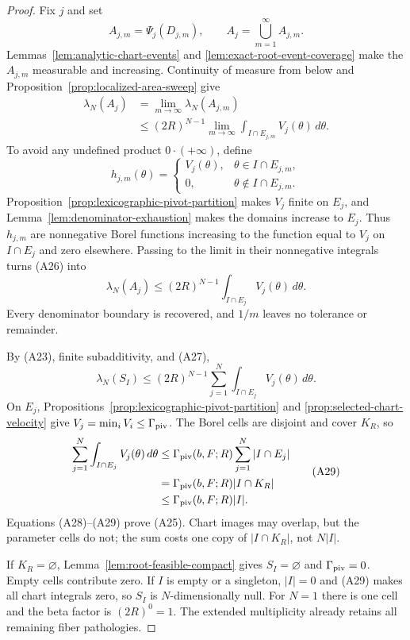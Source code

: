 \begin{proof}
Fix $j$ and set
\[
A_{j,m}=\Psi_j(D_{j,m}),
\qquad A_j=\bigcup_{m=1}^\infty A_{j,m}.
\]
Lemmas~\ref{lem:analytic-chart-events} and
\ref{lem:exact-root-event-coverage} make the $A_{j,m}$ measurable and
increasing.  Continuity of measure from below and
Proposition~\ref{prop:localized-area-sweep} give
\[
\begin{aligned}
\lambda_N(A_j)
&=\lim_{m\to\infty}\lambda_N(A_{j,m})\\
&\leq(2R)^{N-1}\lim_{m\to\infty}
 \int_{I\cap E_{j,m}}V_j(\theta)\,d\theta.
\end{aligned}
\tag{A26}
\]
To avoid any undefined product $0\cdot(+\infty)$, define
\[
h_{j,m}(\theta)=
\begin{cases}
V_j(\theta),&\theta\in I\cap E_{j,m},\\
0,&\theta\notin I\cap E_{j,m}.
\end{cases}
\]
Proposition~\ref{prop:lexicographic-pivot-partition} makes $V_j$ finite on
$E_j$, and Lemma~\ref{lem:denominator-exhaustion} makes the domains increase
to $E_j$.  Thus $h_{j,m}$ are nonnegative Borel functions increasing to the
function equal to $V_j$ on $I\cap E_j$ and zero elsewhere.  Passing to the
limit in their nonnegative integrals turns \textup{(A26)} into
\[
\lambda_N(A_j)
\leq(2R)^{N-1}\int_{I\cap E_j}V_j(\theta)\,d\theta.
\tag{A27}
\]
Every denominator boundary is recovered, and $1/m$ leaves no tolerance or
remainder.

By \textup{(A23)}, finite subadditivity, and \textup{(A27)},
\[
\lambda_N(S_I)
\leq(2R)^{N-1}\sum_{j=1}^N
\int_{I\cap E_j}V_j(\theta)\,d\theta.
\tag{A28}
\]
On $E_j$, Propositions~\ref{prop:lexicographic-pivot-partition} and
\ref{prop:selected-chart-velocity} give
$V_j=\min_iV_i\leq\Gamma_{\rm piv}$.  The Borel cells are disjoint and
cover $K_R$, so
\[
\begin{aligned}
\sum_{j=1}^N\int_{I\cap E_j}V_j(\theta)\,d\theta
&\leq\Gamma_{\rm piv}(b,F;R)\sum_{j=1}^N|I\cap E_j|\\
&=\Gamma_{\rm piv}(b,F;R)|I\cap K_R|\\
&\leq\Gamma_{\rm piv}(b,F;R)|I|.
\end{aligned}
\tag{A29}
\]
Equations \textup{(A28)}--\textup{(A29)} prove \textup{(A25)}.  Chart
images may overlap, but the parameter cells do not; the sum costs one copy
of $|I\cap K_R|$, not $N|I|$.

If $K_R=\varnothing$, Lemma~\ref{lem:root-feasible-compact} gives
$S_I=\varnothing$ and $\Gamma_{\rm piv}=0$.  Empty cells contribute zero.
If $I$ is empty or a singleton, $|I|=0$ and \textup{(A29)} makes all chart
integrals zero, so $S_I$ is $N$-dimensionally null.  For $N=1$ there is one
cell and the beta factor is $(2R)^0=1$.  The extended multiplicity already
retains all remaining fiber pathologies.
\end{proof}

